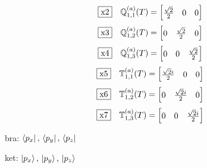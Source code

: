 \documentclass[fleqn,10pt,landscape]{jsarticle}
\begin{document}
\begin{dmath*}
\fbox{x2}\quad \mathbb{Q}_{1,1}^{(a)}(T)=\begin{bmatrix} \frac{\sqrt{2}}{2} & 0 & 0 \end{bmatrix}
\end{dmath*}
\begin{dmath*}
\fbox{x3}\quad \mathbb{Q}_{1,2}^{(a)}(T)=\begin{bmatrix} 0 & \frac{\sqrt{2}}{2} & 0 \end{bmatrix}
\end{dmath*}
\begin{dmath*}
\fbox{x4}\quad \mathbb{Q}_{1,3}^{(a)}(T)=\begin{bmatrix} 0 & 0 & \frac{\sqrt{2}}{2} \end{bmatrix}
\end{dmath*}
\begin{dmath*}
\fbox{x5}\quad \mathbb{T}_{1,1}^{(a)}(T)=\begin{bmatrix} \frac{\sqrt{2} i}{2} & 0 & 0 \end{bmatrix}
\end{dmath*}
\begin{dmath*}
\fbox{x6}\quad \mathbb{T}_{1,2}^{(a)}(T)=\begin{bmatrix} 0 & \frac{\sqrt{2} i}{2} & 0 \end{bmatrix}
\end{dmath*}
\begin{dmath*}
\fbox{x7}\quad \mathbb{T}_{1,3}^{(a)}(T)=\begin{bmatrix} 0 & 0 & \frac{\sqrt{2} i}{2} \end{bmatrix}
\end{dmath*}
\vspace{5mm}

\noindent\textbullet\, bra: $\bra{p_{x}},\, \bra{p_{y}},\, \bra{p_{z}}$

\noindent\textbullet\, ket: $\ket{p_{x}},\, \ket{p_{y}},\, \ket{p_{z}}$
\end{document}
